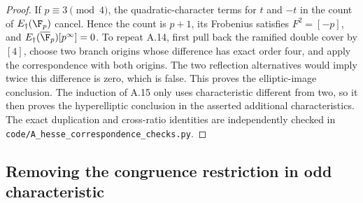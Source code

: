 \begin{proof}
If $p\equiv3\pmod4$, the quadratic-character terms for $t$ and
$-t$ in the count of $E_\dagger(\F_p)$ cancel. Hence the
count is $p+1$, its Frobenius satisfies $F^2=[-p]$, and
$E_\dagger(\overline{\F}_p)[p^\infty]=0$. To repeat A.14,
first pull back the ramified double cover by $[4]$, choose two
branch origins whose difference has exact order four, and
apply the correspondence with both origins. The two reflection
alternatives would imply twice this difference is zero, which
is false. This proves the elliptic-image conclusion. The
induction of A.15 only uses characteristic different from two,
so it then proves the hyperelliptic conclusion in the asserted
additional characteristics. The exact duplication and
cross-ratio identities are independently checked in
\texttt{code/A\_hesse\_correspondence\_checks.py}.
\end{proof}

\subsection{Removing the congruence restriction in odd characteristic}

